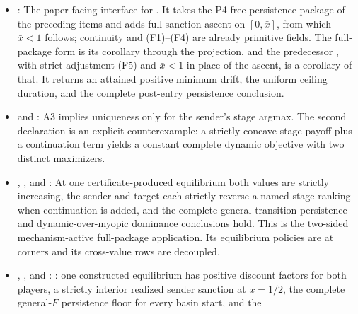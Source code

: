 \begin{itemize}[leftmargin=1.4em,itemsep=1pt]
, headline
row 1, with its minimum-drift sibling, row 2); the strict pivot returns in
.
 is the
projection.
\item {}:
The paper-facing interface for . It takes the
P4-free persistence package of the preceding items and adds full-sanction ascent on
$[0,\bar x]$, from which $\bar x<1$ follows; continuity and
\textup{(F1)--(F4)} are already primitive fields. The full-package form
is its corollary through the projection, and the predecessor
, with strict
adjustment \textup{(F5)} and $\bar x<1$ in place of the ascent, is a
corollary of that. It returns an attained positive minimum
drift, the uniform ceiling duration, and the complete post-entry
persistence conclusion.
\item {} and
:
A3 implies uniqueness only for the sender's stage argmax. The second
declaration is an explicit counterexample: a strictly concave stage
payoff plus a continuation term yields a constant complete dynamic
objective with two distinct maximizers.
\item {},
, and
: At one
certificate-produced equilibrium both values are strictly increasing,
the sender and target each strictly reverse a named stage ranking when
continuation is added, and the complete general-transition persistence
and dynamic-over-myopic dominance conclusions hold. This is the
two-sided mechanism-active full-package application. Its equilibrium
policies are at corners and its cross-value rows are decoupled.
\item {},
, and
:
: one
constructed equilibrium has positive discount factors for both
players, a strictly interior realized sender sanction at $x=1/2$, the
complete general-$F$ persistence floor for every basin start, and the

\end{itemize}
